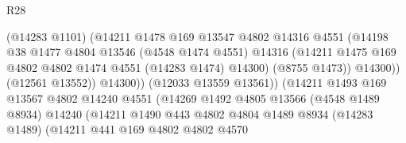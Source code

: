 \begin{lexlean}{R28}
\begin{coremodule}
                                        (@14283 @1101)
                                        (@14211
                                          @1478
                                          @169
                                          @13547
                                          @4802
                                          @14316
                                          @4551
                                          (@14198
                                            @38
                                            @1477
                                            @4804
                                            @13546
                                            (@4548 @1474 @4551)
                                            @14316
                                            (@14211
                                              @1475
                                              @169
                                              @4802
                                              @4802
                                              @1474
                                              @4551
                                              (@14283 @1474)
                                              @14300)
                                            (@8755 @1473))
                                          @14300))
                                      (@12561 @13552))
                                    @14300))
                                (@12033 @13559 @13561))
                              (@14211
                                @1493
                                @169
                                @13567
                                @4802
                                @14240
                                @4551
                                (@14269
                                  @1492
                                  @4805
                                  @13566
                                  (@4548 @1489 @8934)
                                  @14240
                                  (@14211
                                    @1490
                                    @443
                                    @4802
                                    @4804
                                    @1489
                                    @8934
                                    (@14283 @1489)
                                    (@14211
                                      @441
                                      @169
                                      @4802
                                      @4802
                                      @4570

\end{coremodule}
\end{lexlean}
